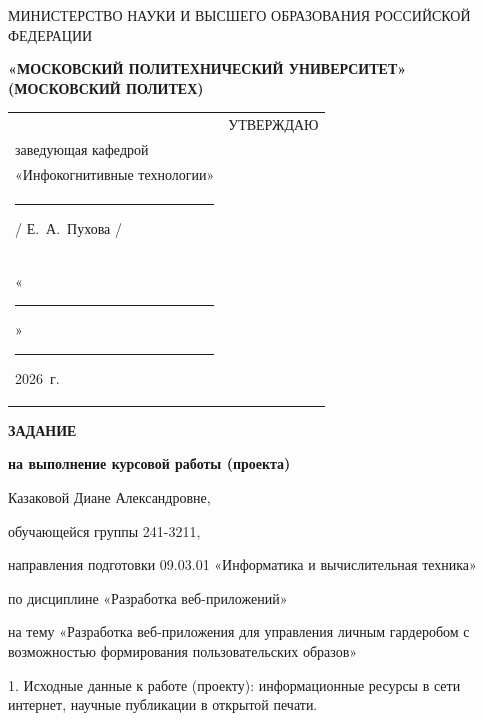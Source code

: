 \documentclass[14pt, a4paper]{extarticle}
\begin{document}
\pagestyle{empty}


\begin{center}
    {\small МИНИСТЕРСТВО НАУКИ И ВЫСШЕГО ОБРАЗОВАНИЯ РОССИЙСКОЙ ФЕДЕРАЦИИ}


    {\small \textbf{«МОСКОВСКИЙ ПОЛИТЕХНИЧЕСКИЙ УНИВЕРСИТЕТ»}} \\
    {\small \textbf{(МОСКОВСКИЙ ПОЛИТЕХ)}}
\end{center}

\begin{tabularx}{\textwidth}{@{} p{} p{} @{}}
     &
    \raggedright
    УТВЕРЖДАЮ                          \\
    заведующая кафедрой                \\
    «Инфокогнитивные технологии»       \\[0.3cm]

    \rule{3cm}{0.4pt} / Е.~А.~Пухова / \\[0.1cm]

    «\rule{0.8cm}{0.4pt}» \rule{3cm}{0.4pt} 2026~г.
\end{tabularx}


\begin{center}

    { \large \textbf{ЗАДАНИЕ}}

    \textbf{на выполнение курсовой работы (проекта)}

    Казаковой Диане Александровне, %

\end{center}

обучающейся группы 241-3211,

направления подготовки 09.03.01 «Информатика и вычислительная техника»

по дисциплине «Разработка веб-приложений»

на тему «Разработка веб-приложения для управления личным гардеробом с возможностью формирования пользовательских образов»

1. Исходные данные к работе (проекту): информационные ресурсы в сети
интернет, научные публикации в открытой печати.
\end{document}
